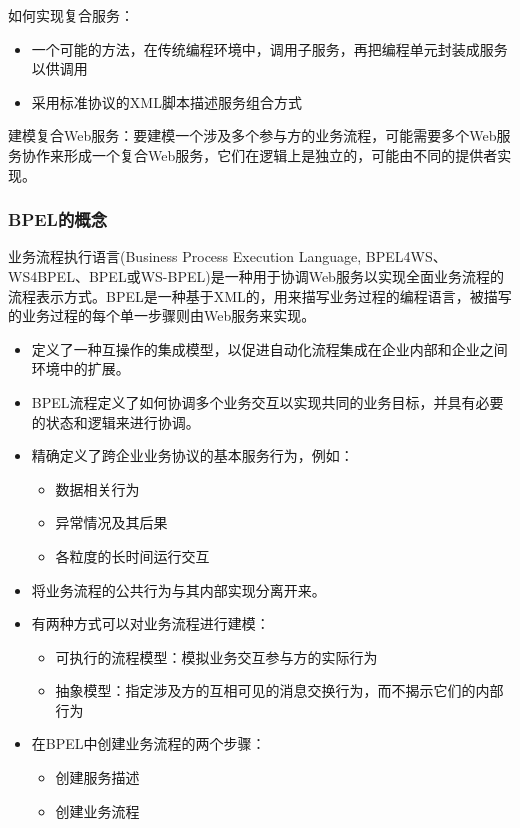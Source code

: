 如何实现复合服务：
\begin{itemize}
    \item 一个可能的方法，在传统编程环境中，调用子服务，再把编程单元封装成服务以供调用
    \item 采用标准协议的XML脚本描述服务组合方式
\end{itemize}

建模复合Web服务：要建模一个涉及多个参与方的业务流程，可能需要多个Web服务协作来形成一个复合Web服务，它们在逻辑上是独立的，可能由不同的提供者实现。

\subsubsection{BPEL的概念}
业务流程执行语言(Business Process Execution Language, BPEL4WS、WS4BPEL、BPEL或WS-BPEL)是一种用于协调Web服务以实现全面业务流程的流程表示方式。BPEL是一种基于XML的，用来描写业务过程的编程语言，被描写的业务过程的每个单一步骤则由Web服务来实现。
\begin{itemize}
    \item 定义了一种互操作的集成模型，以促进自动化流程集成在企业内部和企业之间环境中的扩展。
    \item BPEL流程定义了如何协调多个业务交互以实现共同的业务目标，并具有必要的状态和逻辑来进行协调。
    \item 精确定义了跨企业业务协议的基本服务行为，例如：
    \vspace{-0.8em}
    \begin{multicols}{3}
        \begin{itemize}
            \item 数据相关行为
            \item 异常情况及其后果
            \item 各粒度的长时间运行交互
        \end{itemize}
    \end{multicols}
    \vspace{-1em}
    \item 将业务流程的公共行为与其内部实现分离开来。
    \item 有两种方式可以对业务流程进行建模：
    \begin{itemize}
        \item 可执行的流程模型：模拟业务交互参与方的实际行为
        \item 抽象模型：指定涉及方的互相可见的消息交换行为，而不揭示它们的内部行为
    \end{itemize}
    \item 在BPEL中创建业务流程的两个步骤：
    \vspace{-0.8em}
    \begin{multicols}{2}
        \begin{itemize}
            \item 创建服务描述
            \item 创建业务流程
        \end{itemize}
    \end{multicols}
    \vspace{-1em}
\end{itemize}

